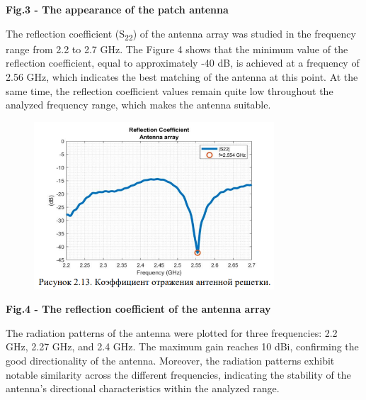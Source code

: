 {\bfseries Fig.3 - The appearance of the patch antenna}

The reflection coefficient (S\textsubscript{22}) of the antenna array
was studied in the frequency range from 2.2 to 2.7 GHz. The Figure 4
shows that the minimum value of the reflection coefficient, equal to
approximately -40 dB, is achieved at a frequency of 2.56 GHz, which
indicates the best matching of the antenna at this point. At the same
time, the reflection coefficient values \hspace{0pt}\hspace{0pt}remain
quite low throughout the analyzed frequency range, which makes the
antenna suitable.


\begin{figure}[H]
	\centering
	\includegraphics[width=0.8\textwidth]{media/ict/image44}
	\caption*{}
\end{figure}


{\bfseries Fig.4 - The reflection coefficient of the antenna array}

The radiation patterns of the antenna were plotted for three
frequencies: 2.2 GHz, 2.27 GHz, and 2.4 GHz. The maximum gain reaches 10
dBi, confirming the good directionality of the antenna. Moreover, the
radiation patterns exhibit notable similarity across the different
frequencies, indicating the stability of the antenna's directional
characteristics within the analyzed range.


